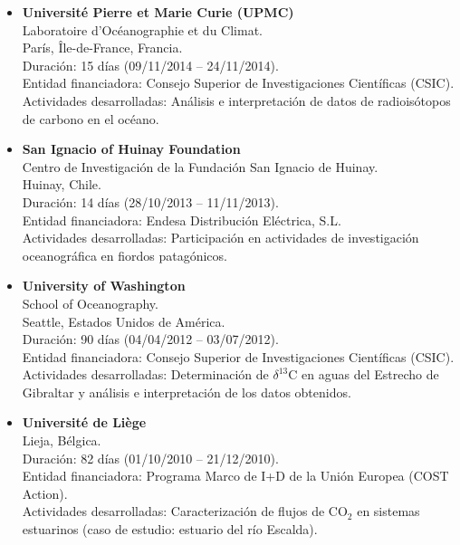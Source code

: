\documentclass[11pt,a4paper]{article}
\begin{document}
\begin{itemize}[leftmargin=*]

    \item \textbf{Université Pierre et Marie Curie (UPMC)}\\
    Laboratoire d’Océanographie et du Climat.\\
    París, Île-de-France, Francia.\\
    Duración: 15 días (09/11/2014 -- 24/11/2014).\\
    Entidad financiadora: Consejo Superior de Investigaciones Científicas (CSIC).\\
    Actividades desarrolladas: Análisis e interpretación de datos de radioisótopos de carbono en el océano.

    \item \textbf{San Ignacio of Huinay Foundation}\\
    Centro de Investigación de la Fundación San Ignacio de Huinay.\\
    Huinay, Chile.\\
    Duración: 14 días (28/10/2013 -- 11/11/2013).\\
    Entidad financiadora: Endesa Distribución Eléctrica, S.L.\\
    Actividades desarrolladas: Participación en actividades de investigación oceanográfica en fiordos patagónicos.

    \item \textbf{University of Washington}\\
    School of Oceanography.\\
    Seattle, Estados Unidos de América.\\
    Duración: 90 días (04/04/2012 -- 03/07/2012).\\
    Entidad financiadora: Consejo Superior de Investigaciones Científicas (CSIC).\\
    Actividades desarrolladas: Determinación de $\delta^{13}$C en aguas del Estrecho de Gibraltar y análisis e interpretación de los datos obtenidos.

    \item \textbf{Université de Liège}\\
    Lieja, Bélgica.\\
    Duración: 82 días (01/10/2010 -- 21/12/2010).\\
    Entidad financiadora: Programa Marco de I+D de la Unión Europea (COST Action).\\
    Actividades desarrolladas: Caracterización de flujos de CO$_2$ en sistemas estuarinos (caso de estudio: estuario del río Escalda).

\end{itemize}
\end{document}
